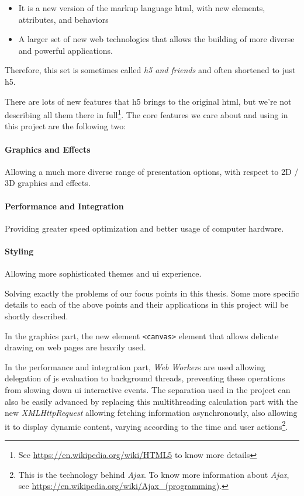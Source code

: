\begin{itemize}
    \item It is a new version of the markup language \gls{html}, with new elements, attributes, and behaviors
    \item A larger set of new web technologies that allows the building of more diverse and powerful applications.
\end{itemize}

Therefore, this set is sometimes called \emph{\gls{h5} and friends} and often shortened to just \gls{h5}.

There are lots of new features that \gls{h5} brings to the original \gls{html}, but we're not describing all them there in full\footnote{ See \url{https://en.wikipedia.org/wiki/HTML5} to know more details}. The core features we care about and using in this project are the following two:

\paragraph{Graphics and Effects} Allowing a much more diverse range of presentation options, with respect to 2D / 3D graphics and effects.
\paragraph{Performance and Integration} Providing greater speed optimization and better usage of computer hardware.
\paragraph{Styling} Allowing more sophisticated themes and \gls{ui} experience.

Solving exactly the problems of our focus points in this thesis. Some more specific details to each of the above points and their applications in this project will be shortly described.

In the graphics part, the new element \texttt{<canvas>} element that allows delicate drawing on web pages are heavily used. 

In the performance and integration part, \emph{Web Worker}s are used allowing delegation of \gls{js} evaluation to background threads, preventing these operations from slowing down \gls{ui} interactive events. The separation used in the project can also be easily advanced by replacing this multithreading calculation part with the new \emph{XMLHttpRequest} allowing fetching information asynchronously, also allowing it to display dynamic content, varying according to the time and user actions\footnote{ This is the technology behind \emph{Ajax}. To know more information about \emph{Ajax}, see \url{https://en.wikipedia.org/wiki/Ajax_(programming)}.}. 

